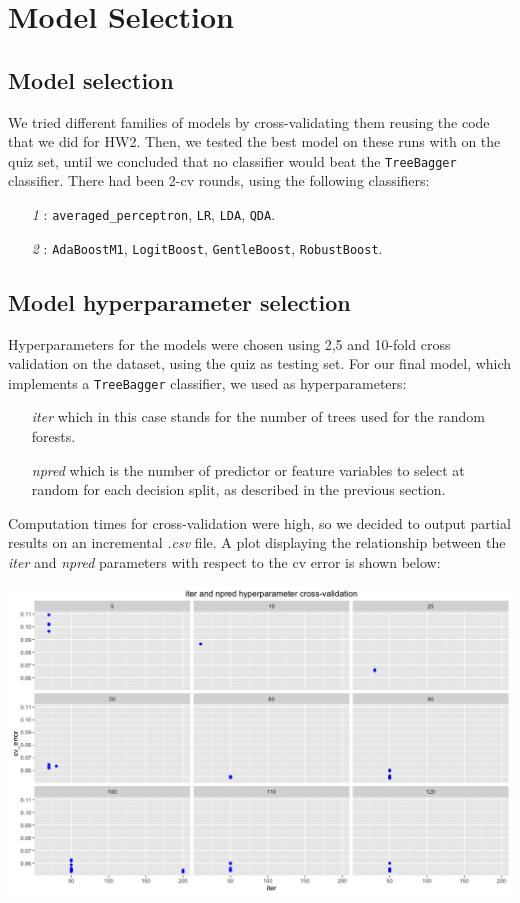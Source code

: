 \chapter{Model Selection}
\label{ch:ch4cv}

\section{Model selection}
We tried different families of models by cross-validating them reusing the code that we did for HW2. Then, we tested the best model on these runs with on the quiz set, until we concluded that no classifier would beat the \verb|TreeBagger| classifier. There had been 2-cv rounds, using the following classifiers: 

\begin{itemize}
\item[\textit{1}]: \verb|averaged_perceptron|, \verb|LR|, \verb|LDA|, \verb|QDA|.
\item[\textit{2}]: \verb|AdaBoostM1|, \verb|LogitBoost|, \verb|GentleBoost|, \verb|RobustBoost|.
\end{itemize}

\section{Model hyperparameter selection}
Hyperparameters for the models were chosen using 2,5 and 10-fold cross validation on the dataset, using the quiz as testing set.
For our final model, which implements a \verb|TreeBagger| classifier, we used as hyperparameters: 
\begin{itemize}
    \item[\textit{iter}] which in this case stands for the number of trees used for the random forests.
    \item[\textit{npred}] which is the number of predictor or feature variables to select at random for each decision split, as described in the previous section.
\end{itemize}

Computation times for cross-validation were high, so we decided to output partial results on an incremental \textit{.csv} file. A plot displaying the relationship between the \textit{iter} and \textit{npred} parameters with respect to the cv error is shown below: 

\begin{center}
  \includegraphics[scale=0.35]{./cv.png}
\end{center}    



